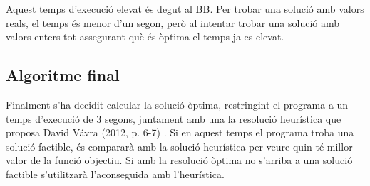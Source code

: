 Aquest temps d'execució elevat és degut al \gls{BB}. Per trobar una solució amb valors reals, el temps és menor d'un segon, però al intentar trobar una solució amb valors enters tot assegurant què és òptima el temps ja es elevat.

\subsection{Algoritme final}
Finalment s'ha decidit calcular la solució òptima, restringint el programa a un temps d'execució de 3 segons, juntament amb una la resolució heurística que proposa David Vávra (2012, p. 6-7) \cite{Settle_up}. Si en aquest temps el programa troba una solució factible, és compararà amb la solució heurística per veure quin té millor valor de la funció objectiu. Si amb la resolució òptima no s'arriba a una solució factible s'utilitzarà l'aconseguida amb l'heurística. 


